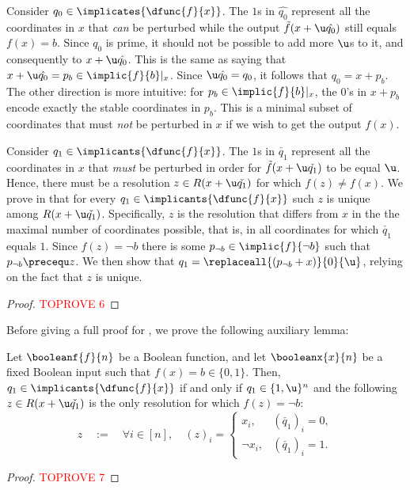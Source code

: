 \documentclass[acmsmall, nonacm, authorversion]{acmart}
\begin{document}
Consider $q_0\in\implicates{\dfunc{f}{x}}$. The $1$s in $\hat{q_0}$ represent all the coordinates in $x$ that \emph{can} be perturbed while the output $\tilde{f}(x+\u\hat{q_0})$ still equals $f(x)=b$. Since $q_0$ is prime, it should not be possible to add more $\u$s to it, and consequently to $x+\u\hat{q_0}$. This is the same as saying that $x+\u\hat{q_0}=p_b \in \implic{f}{b}|_x$. Since $\u\hat{q_0}=q_0$, it follows that $q_0=x+p_b$. The other direction is more intuitive: for $p_b \in \implic{f}{b}|_x$, the $0$'s in $x + p_b$ encode exactly the stable coordinates in $p_b$. This is a minimal subset of coordinates that must \emph{not} be perturbed in $x$ if we wish to get the output $f(x)$.

Consider $q_1\in \implicants{\dfunc{f}{x}}$. The $1$s in $\check{q_1}$ represent all the coordinates in $x$ that \emph{must} be perturbed in order for $\tilde{f}(x+\u\check{q_1})$ to be equal $\u$. Hence, there must be a resolution $z\in R(x+\u\check{q_1})$ for which $f(z)\neq f(x)$. We prove in  that for every $q_1\in \implicants{\dfunc{f}{x}}$ such $z$ is unique among $R(x+\u\check{q_1})$. Specifically, $z$ is the resolution that differs from $x$ in the the maximal number of coordinates possible, that is, in all coordinates for which $\check{q_1}$ equals $1$. Since $f(z)=\neg b$ there is some $p_{\neg b}\in \implic{f}{\neg b}$ such that $p_{\neg b}\precequ z$. We then show that $q_1=\replaceall{(p_{\neg b}+x)}{0}{\u}$, relying on the fact that $z$ is unique.

\begin{proof}\textcolor{red}{TOPROVE 6}\end{proof}

Before giving a full proof for , we prove the following auxiliary lemma:

\begin{lemma}\label{lem:prime-implicants-df-aux}
Let $\booleanf{f}{n}$ be a Boolean function, and let $\booleanx{x}{n}$ be a fixed Boolean input such that $f(x)=b\in\{0,1\}$. Then, $q_1\in \implicants{\dfunc{f}{x}}$ if and only if $q_1\in \{1,\u\}^n$ and the following $z\in  R(x+\u\check{q_1})$ is the only resolution for which $f(z)=\neg b$:
\[
    z\quad :=\quad \forall i\in [n], \quad (z)_{i}=\begin{cases}
        x_{i}, & (\check{q_1})_{i} = 0, \\
        \neg x_{i}, & (\check{q_1})_{i} = 1.
    \end{cases}
\]
\end{lemma}
\begin{proof}\textcolor{red}{TOPROVE 7}\end{proof}
\end{document}
